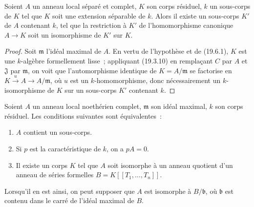 \begin{corollary}[19.6.2]
\label{0.19.6.2-fr}
Soient $A$ un anneau local séparé et complet, $K$ son corps résiduel, $k$ un
sous-corps de $K$ tel que $K$ soit une extension séparable de $k$. Alors il
existe un sous-corps $K'$ de $A$ contenant $k$, tel que la restriction à $K'$
de l'homomorphisme canonique $A\to K$ soit un isomorphisme de $K'$ sur $K$.
\end{corollary}

\begin{proof}
Soit $\mathfrak m$ l'idéal maximal de $A$. En vertu de l'hypothèse et de
(19.6.1), $K$ est une $k$-algèbre formellement lisse~; appliquant (19.3.10) en
remplaçant $C$ par $A$ et $\mathfrak J$ par $\mathfrak m$, on voit que
l'automorphisme identique de $K=A/\mathfrak m$ se factorise en
$K\xrightarrow{u}A\to A/\mathfrak m$, où $u$ est un $k$-homomorphisme, donc
nécessairement un $k$-isomorphisme de $K$ sur un sous-corps $K'$ contenant
$k$.
\end{proof}

\begin{corollary}[19.6.3]
\label{0.19.6.3-fr}
Soient $A$ un anneau local noethérien complet, $\mathfrak m$ son idéal maximal,
$k$ son corps résiduel. Les conditions suivantes sont équivalentes~:
\begin{enumerate}
  \item[\textup{a)}] $A$ contient un sous-corps.
  \item[\textup{b)}] Si $p$ est la caractéristique de $k$, on a $pA=0$.
  \item[\textup{c)}] Il existe un corps $K$ tel que $A$ soit isomorphe à un anneau
  quotient d'un anneau de séries formelles $B=K[[T_1,\ldots,T_n]]$.
\end{enumerate}
Lorsqu'il en est ainsi, on peut supposer que $A$ est isomorphe à $B/\mathfrak b$,
où $\mathfrak b$ est contenu dans le carré de l'idéal maximal de $B$.
\end{corollary}


